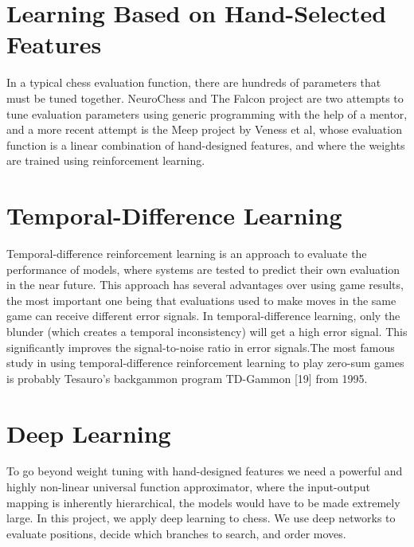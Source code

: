 \documentclass[12pt, a4paper]{report}
\begin{document}
	\section{Learning Based on Hand-Selected Features}
	In a typical chess evaluation function, there are hundreds of parameters that must be tuned together. NeuroChess and The Falcon project are two attempts to tune evaluation parameters using generic programming with the help of a mentor, and a more recent attempt is the Meep project by Veness et al, whose evaluation function is a linear combination of hand-designed features, and where the weights are trained using reinforcement learning.
	\section{Temporal-Difference Learning}
	Temporal-difference reinforcement learning is an approach to evaluate the performance of models, where systems are  tested to predict their own evaluation in the near future.
	This approach has several advantages over using game results, the most important one being that evaluations used to make moves in the same game can receive different error signals.
	In temporal-difference learning, only the blunder (which creates a temporal inconsistency) will get a high error signal. This significantly improves the signal-to-noise ratio in error signals.The most famous study in using temporal-difference reinforcement learning to play zero-sum games is probably Tesauro's backgammon program TD-Gammon [19] from 1995.
	\section{Deep Learning}
	To go beyond weight tuning with hand-designed features we need a powerful and highly non-linear universal function approximator, where the input-output mapping is inherently hierarchical, the models would have to be made extremely large.
	In this project, we apply deep learning to chess. We use deep networks to evaluate positions, decide which branches to search, and order moves.

	
\end{document}
